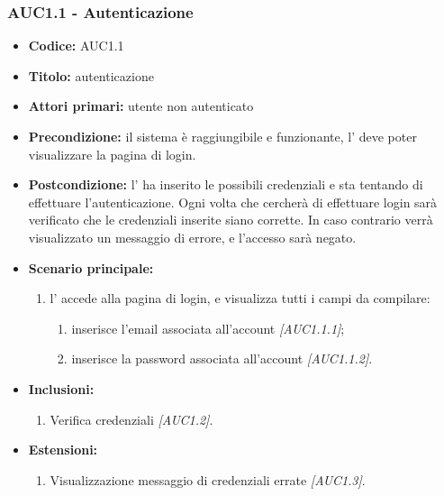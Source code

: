 \documentclass[casi-duso]{subfiles}
\begin{document}
\subsubsection{AUC1.1 - Autenticazione}
\label{subsub:AUC1.1}




\begin{itemize}
  \item \textbf{Codice:} AUC1.1
  \item \textbf{Titolo:} autenticazione
  \item \textbf{Attori primari:} utente non autenticato
  \item \textbf{Precondizione:} il sistema è raggiungibile e funzionante, l' deve poter visualizzare la pagina di login.
  \item \textbf{Postcondizione:} l' ha inserito le possibili credenziali e sta tentando di effettuare l'autenticazione. Ogni volta che cercherà di effettuare
        login sarà verificato che le credenziali inserite siano corrette. In caso contrario verrà visualizzato un messaggio di errore, e l'accesso sarà negato.
  \item \textbf{Scenario principale:} 
  \begin{enumerate}
    \item  l' accede alla pagina di login, e visualizza tutti i campi da compilare:
    \begin{enumerate}
      \item inserisce l’email associata all’account \emph{[AUC1.1.1]};
      \item inserisce la password associata all’account \emph{[AUC1.1.2]}.
    \end{enumerate}
  \end{enumerate}
  \item \textbf{Inclusioni:}
  \begin{enumerate}
    \item Verifica credenziali \emph{[AUC1.2]}.
  \end{enumerate}
  \item \textbf{Estensioni:}
  \begin{enumerate}
    \item Visualizzazione messaggio di credenziali errate \emph{[AUC1.3]}.
  \end{enumerate}
\end{itemize}
\end{document}
